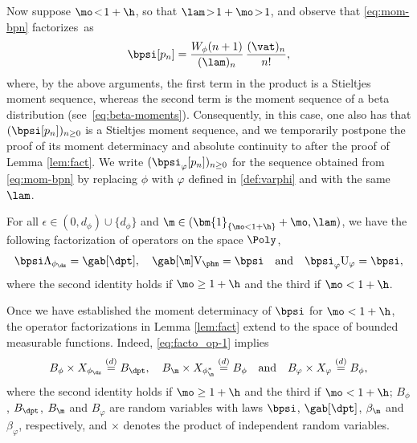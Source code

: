 Now suppose $\mo\!<\!1+\h$, so that $\lam\!>\!1+\mo\!>\!1$, and observe that \eqref{eq:mom-bpn} factorizes~as
\begin{equation*}
\bpsi [p_n] = \frac{W_{\phi}(n+1)}{(\lam)_n}\, \frac{(\vat)_n}{n!},
\end{equation*}
where, by the above arguments, the first term in the product is a Stieltjes moment sequence, whereas the second term is the moment sequence of a beta distribution (see~\eqref{eq:beta-moments}). Consequently, in this case, one also has that $(\bpsi [p_n])_{n \geq 0}$ is a Stieltjes moment sequence, and we temporarily postpone the proof of its moment determinacy and absolute continuity to after the proof of Lemma \ref{lem:fact}. We write $(\bpsi_\varphi [p_n])_{n \geq 0}$ for the sequence obtained from \eqref{eq:mom-bpn} by replacing $\phi$ with $\varphi$ defined in \eqref{def:varphi} and with the same $\lam$.

\begin{lemma}
\label{lem:fact}
For all $\epsilon \in (0,d_\phi) \cup \{d_\phi\}$ and $\m \in (\bm{1}_{\{\mo < 1+\h\}} + \mo, \lam)$,
we have the following factorization of operators on the space $\Poly$,
\begin{equation}
\label{eq:facto_op-1}
\bpsi \Lambda_{\phi_{\dz}} = \gab[\dpt], \quad \gab[\m] \mathrm{V}_{\phm} = \bpsi \quad \text{and} \quad \bpsi_\varphi \mathrm{U}_\varphi = \bpsi,
\end{equation}
where the second identity holds if $\mo \geq 1+\h$ and the third if $\mo < 1+\h$.
\end{lemma}

\begin{remark}
\label{rem:facto}
Once we have established the moment determinacy of $\bpsi$ for $\mo < 1+\h$, the operator factorizations in
Lemma \ref{lem:fact} extend to the space of bounded measurable functions. Indeed, \eqref{eq:facto_op-1} implies
\begin{equation*}
B_\phi \times X_{\phi_{\dz}} \stackrel{(d)}{=} B_{\dpt}, \quad B_{\m} \times X_{\phi^*_{\m}} \stackrel{(d)}{=} B_{\phi}
\quad \mbox{and} \quad B_{\varphi} \times X_{\varphi} \stackrel{(d)}{=} B_{\phi},
\end{equation*}
where the second identity holds if $\mo \geq 1+\h$ and the third if $\mo < 1+\h$;
$B_\phi$, $B_{\dpt}$, $B_{\m}$ and $B_{\varphi}$ are random variables with laws
$\bpsi$, $\gab[\dpt]$, $\beta_{\m}$ and $\beta_{\varphi}$, respectively, and $\times$ denotes the
product of independent random variables.
\end{remark}

